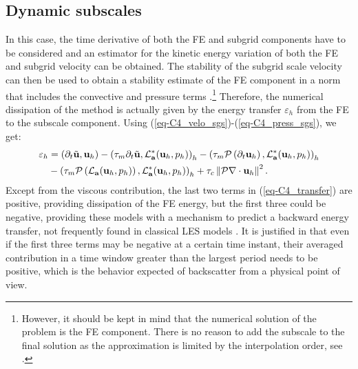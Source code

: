 \subsection{Dynamic subscales} 

In this case, the time derivative of both the FE and subgrid components have to be considered and an estimator for the kinetic energy variation of both the FE and subgrid velocity can be obtained. The stability of the subgrid scale velocity can then be used to obtain a stability estimate of the FE component in a norm that includes the convective and pressure terms \cite{codina_time_2007,badia_multiscale_2009,Badia2010}.\footnote{However, it should be kept in mind that the numerical solution of the problem is the FE component. There is no reason to add the subscale to the final solution as the approximation is limited by the interpolation order, see \cite[Remark 10]{codina_time_2007}.} Therefore, the numerical dissipation of the method is actually given by the energy transfer $\varepsilon_h$ from the FE to the subscale component. 
Using (\ref{eq-C4_velo_sgs})-(\ref{eq-C4_press_sgs}), we get:
\begin{align}
\label{eq-C4_transfer}
\varepsilon_{h} & = 
  \left( \partial_t\tilde{\u} , \u_h\right) 
- \left( \tau_m \partial_t\tilde{\u} , \mathcal{L}^*_{\a} ( \u_{h},p_h)\right) _h 
- \left( \tau_{m} \mathcal{P} \left(  \partial_t \u_h \right), \mathcal{L}^*_{\a} ( \u_{h},p_h)\right)_h \\ \nonumber
& 
- \left( \tau_{m} \mathcal{P} \left(  \mathcal{L}_{\a} ( \u_{h},p_h) \right), \mathcal{L}^*_{\a} ( \u_{h},p_h) \right)_h
+ \tau_{c} \left\| \mathcal{P} \nabla \cdot \u_{h}\right\|^{2}. %
\end{align}
Except from the viscous contribution, the last two terms in (\ref{eq-C4_transfer}) are positive, providing dissipation of the FE energy, but the first three could be negative, providing these models with a mechanism to predict a backward energy transfer, not frequently found in classical LES models \cite{Sagaut2006}. It is justified in \cite{Codina-chap-2011} that even if the first three terms may be negative at a certain time instant, their averaged contribution in a time window greater than the largest period needs to be positive, which is the behavior expected of backscatter from a physical point of view. 

